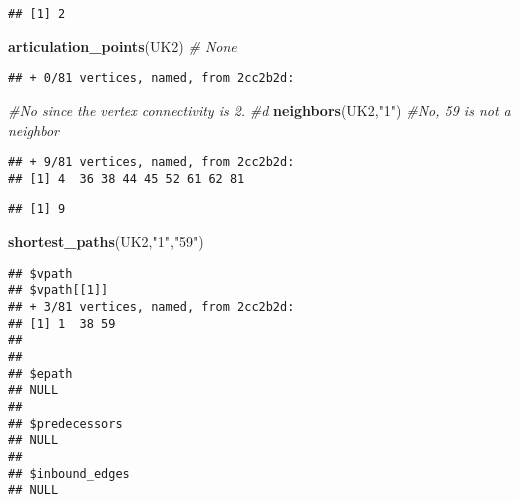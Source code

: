 \documentclass[
]{article}
\newenvironment{Shaded}{\begin{snugshade}}{\end{snugshade}}
\newcommand{\CommentTok}[1]{\textcolor[rgb]{0.56,0.35,0.01}{\textit{#1}}}
\newcommand{\KeywordTok}[1]{\textcolor[rgb]{0.13,0.29,0.53}{\textbf{#1}}}
\newcommand{\NormalTok}[1]{#1}
\newcommand{\StringTok}[1]{\textcolor[rgb]{0.31,0.60,0.02}{#1}}
\begin{document}
\begin{verbatim}
## [1] 2
\end{verbatim}

\begin{Shaded}
\begin{Highlighting}[]
\KeywordTok{articulation_points}\NormalTok{(UK2) }\CommentTok{# None}
\end{Highlighting}
\end{Shaded}

\begin{verbatim}
## + 0/81 vertices, named, from 2cc2b2d:
\end{verbatim}

\begin{Shaded}
\begin{Highlighting}[]
\CommentTok{#No since the vertex connectivity is 2.}
\CommentTok{#d}
\KeywordTok{neighbors}\NormalTok{(UK2,}\StringTok{"1"}\NormalTok{)                 }\CommentTok{#No, 59 is not a neighbor}
\end{Highlighting}
\end{Shaded}

\begin{verbatim}
## + 9/81 vertices, named, from 2cc2b2d:
## [1] 4  36 38 44 45 52 61 62 81
\end{verbatim}

\begin{Shaded}
\end{Shaded}

\begin{verbatim}
## [1] 9
\end{verbatim}

\begin{Shaded}
\begin{Highlighting}[]
\KeywordTok{shortest_paths}\NormalTok{(UK2,}\StringTok{"1"}\NormalTok{,}\StringTok{"59"}\NormalTok{)}
\end{Highlighting}
\end{Shaded}

\begin{verbatim}
## $vpath
## $vpath[[1]]
## + 3/81 vertices, named, from 2cc2b2d:
## [1] 1  38 59
## 
## 
## $epath
## NULL
## 
## $predecessors
## NULL
## 
## $inbound_edges
## NULL
\end{verbatim}
\end{document}
